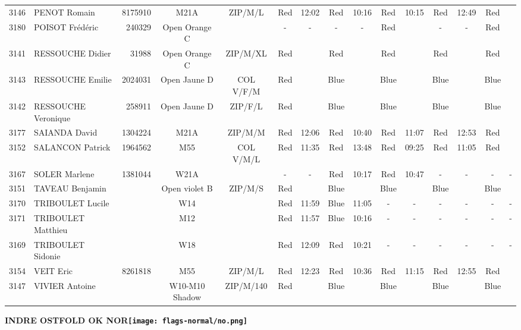 \documentclass{report}
\begin{document}
\begin{longtable}{|c|l|r|c|c|*{5}{cc|}}
    3146 & PENOT Romain & 8175910 & M21A & ZIP/M/L & Red & 12:02 & Red & 10:16 & Red & 10:15 & Red & 12:49 & Red &  \\
    3180 & POISOT Frédéric & 240329 & Open Orange C &   & - &  - & - &  - & Red &   & - &  - & Red &  \\
    3141 & RESSOUCHE Didier & 31988 & Open Orange C & ZIP/M/XL & Red &   & Red &   & Red &   & Red &   & Red &  \\
    3143 & RESSOUCHE Emilie & 2024031 & Open Jaune D & COL V/F/M & Red &   & Blue &   & Blue &   & Blue &   & Blue &  \\
    3142 & RESSOUCHE Veronique & 258911 & Open Jaune D & ZIP/F/L & Red &   & Blue &   & Blue &   & Blue &   & Blue &  \\
    3177 & SAIANDA David & 1304224 & M21A & ZIP/M/M & Red & 12:06 & Red & 10:40 & Red & 11:07 & Red & 12:53 & Red &  \\
    3152 & SALANCON Patrick & 1964562 & M55 & COL V/M/L & Red & 11:35 & Red & 13:48 & Red & 09:25 & Red & 11:05 & Red &  \\
    3167 & SOLER Marlene & 1381044 & W21A &   & - &  - & Red & 10:17 & Red & 10:47 & - &  - & - &  -\\
    3151 & TAVEAU Benjamin &  & Open violet B & ZIP/M/S & Red &   & Blue &   & Blue &   & Blue &   & Blue &  \\
    3170 & TRIBOULET Lucile &  & W14 &   & Red & 11:59 & Blue & 11:05 & - &  - & - &  - & - &  -\\
    3171 & TRIBOULET Matthieu &  & M12 &   & Red & 11:57 & Blue & 10:16 & - &  - & - &  - & - &  -\\
    3169 & TRIBOULET Sidonie &  & W18 &   & Red & 12:09 & Red & 10:21 & - &  - & - &  - & - &  -\\
    3154 & VEIT Eric & 8261818 & M55 & ZIP/M/L & Red & 12:23 & Red & 10:36 & Red & 11:15 & Red & 12:55 & Red &  \\
    3147 & VIVIER Antoine &  & W10-M10 Shadow & ZIP/M/140 & Red &   & Blue &   & Blue &   & Blue &   & Blue &  \\
  \end{longtable}
\newpage
  \Huge \centering \bfseries INDRE OSTFOLD OK  NOR\normalfont \footnotesize \sffamily \hfill \texttt{[image: flags-normal/no.png]} \newline 
\end{document}
